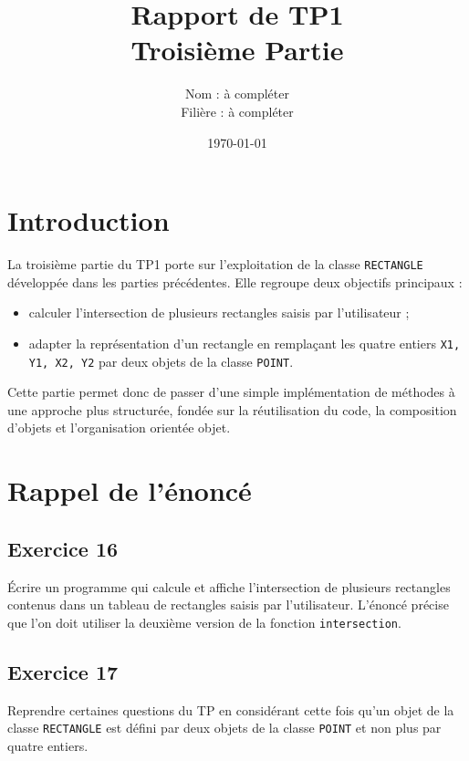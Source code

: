 \documentclass[12pt,a4paper]{article}
\title{Rapport de TP1 \\ Troisi\`eme Partie}
\author{Nom : \`a compl\'eter \\ Fili\`ere : \`a compl\'eter}
\date{\today}
\begin{document}
\maketitle
\tableofcontents
\newpage

\section{Introduction}
La troisi\`eme partie du TP1 porte sur l'exploitation de la classe \texttt{RECTANGLE} d\'evelopp\'ee dans les parties pr\'ec\'edentes. Elle regroupe deux objectifs principaux :
\begin{itemize}[leftmargin=*]
    \item calculer l'intersection de plusieurs rectangles saisis par l'utilisateur ;
    \item adapter la repr\'esentation d'un rectangle en rempla\c{c}ant les quatre entiers \texttt{X1, Y1, X2, Y2} par deux objets de la classe \texttt{POINT}.
\end{itemize}

Cette partie permet donc de passer d'une simple impl\'ementation de m\'ethodes \`a une approche plus structur\'ee, fond\'ee sur la r\'eutilisation du code, la composition d'objets et l'organisation orient\'ee objet.

\section{Rappel de l'\'enonc\'e}
\subsection{Exercice 16}
\'Ecrire un programme qui calcule et affiche l'intersection de plusieurs rectangles contenus dans un tableau de rectangles saisis par l'utilisateur. L'\'enonc\'e pr\'ecise que l'on doit utiliser la deuxi\`eme version de la fonction \texttt{intersection}.

\subsection{Exercice 17}
Reprendre certaines questions du TP en consid\'erant cette fois qu'un objet de la classe \texttt{RECTANGLE} est d\'efini par deux objets de la classe \texttt{POINT} et non plus par quatre entiers.
\end{document}
